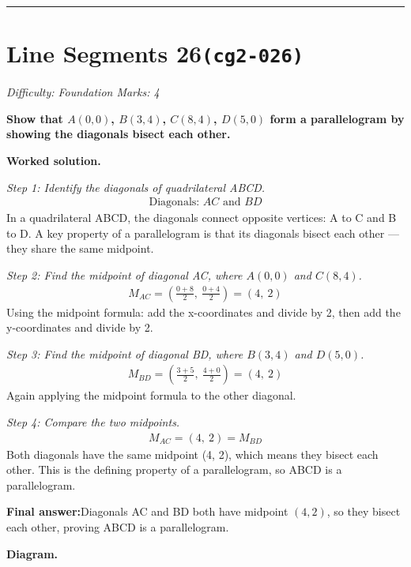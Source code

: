 \documentclass[11pt]{article}
\newcommand{\question}[1]{\par\medskip\noindent\textbf{#1}\par}
\begin{document}
\medskip\hrule

\section*{Line Segments 26\quad\small\texttt{(cg2-026)}}
\textit{Difficulty: Foundation \quad\textbar\quad Marks: 4}

\question{Show that \( A(0, 0) \), \( B(3, 4) \), \( C(8, 4) \), \( D(5, 0) \) form a parallelogram by showing the diagonals bisect each other.}

\textbf{Worked solution.}

\textit{Step 1: Identify the diagonals of quadrilateral ABCD.}
\[\begin{gathered}
\text{Diagonals: } AC \text{ and } BD
\end{gathered}\]
In a quadrilateral ABCD, the diagonals connect opposite vertices: A to C and B to D. A key property of a parallelogram is that its diagonals bisect each other --- they share the same midpoint.

\textit{Step 2: Find the midpoint of diagonal AC, where \( A(0,0) \) and \( C(8,4) \).}
\[\begin{gathered}
M_{AC} = \left(\frac{0+8}{2},\ \frac{0+4}{2}\right) = (4,\ 2)
\end{gathered}\]
Using the midpoint formula: add the x-coordinates and divide by 2, then add the y-coordinates and divide by 2.

\textit{Step 3: Find the midpoint of diagonal BD, where \( B(3,4) \) and \( D(5,0) \).}
\[\begin{gathered}
M_{BD} = \left(\frac{3+5}{2},\ \frac{4+0}{2}\right) = (4,\ 2)
\end{gathered}\]
Again applying the midpoint formula to the other diagonal.

\textit{Step 4: Compare the two midpoints.}
\[\begin{gathered}
M_{AC} = (4,\ 2) = M_{BD}
\end{gathered}\]
Both diagonals have the same midpoint (4, 2), which means they bisect each other. This is the defining property of a parallelogram, so ABCD is a parallelogram.

\begin{answerbox}
\textbf{Final answer:}\quad Diagonals AC and BD both have midpoint \(\displaystyle (4, 2)\), so they bisect each other, proving ABCD is a parallelogram.
\end{answerbox}
\textbf{Diagram.}
\end{document}
